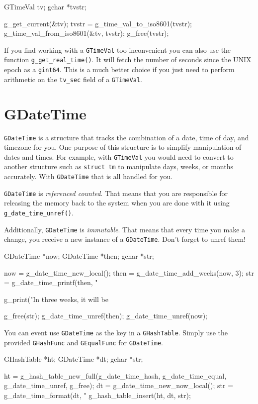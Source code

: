 \begin{code}{}
GTimeVal tv;
gchar *tvstr;

g_get_current(&tv);
tvstr = g_time_val_to_iso8601(tvstr);
g_time_val_from_iso8601(&tv, tvstr);
g_free(tvstr);
\end{code}

If you find working with a \verb|GTimeVal| too inconvenient you can also use the function \verb|g_get_real_time()|.
It will fetch the number of seconds since the UNIX epoch as a \verb|gint64|.
This is a much better choice if you just need to perform arithmetic on the \verb|tv_sec| field of a \verb|GTimeVal|.


\section{GDateTime}

\verb|GDateTime| is a structure that tracks the combination of a date, time of day, and timezone for you.
One purpose of this structure is to simplify manipulation of dates and times.
For example, with \verb|GTimeVal| you would need to convert to another structure such as \verb|struct tm| to manipulate days, weeks, or months accurately.
With \verb|GDateTime| that is all handled for you.

\verb|GDateTime| is \emph{referenced counted}.
That means that you are responsible for releasing the memory back to the system when you are done with it using \verb|g_date_time_unref()|.

Additionally, \verb|GDateTime| is \emph{immutable}.
That means that every time you make a change, you receive a new instance of a \verb|GDateTime|.
Don't forget to unref them!

\begin{code}{}
GDateTime *now;
GDateTime *then;
gchar *str;

now = g_date_time_new_local();
then = g_date_time_add_weeks(now, 3);
str = g_date_time_printf(then, "%

g_print("In three weeks, it will be %

g_free(str);
g_date_time_unref(then);
g_date_time_unref(now);
\end{code}

You can event use \verb|GDateTime| as the key in a \verb|GHashTable|.
Simply use the provided \verb|GHashFunc| and \verb|GEqualFunc| for \verb|GDateTime|.

\begin{code}{}
GHashTable *ht;
GDateTime *dt;
gchar *str;

ht = g_hash_table_new_full(g_date_time_hash,
                           g_date_time_equal,
                           g_date_time_unref,
                           g_free);
dt = g_date_time_new_now_local();
str = g_date_time_format(dt, "%
g_hash_table_insert(ht, dt, str);
\end{code}


